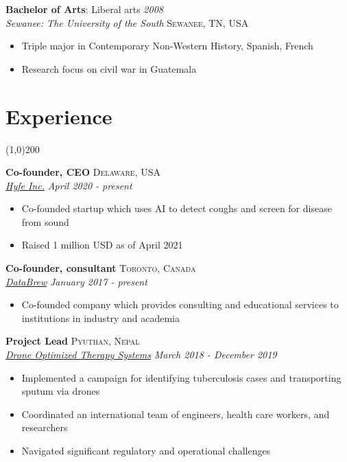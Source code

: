 \documentclass[11pt]{article}
\begin{document}
{\noindent \textbf{Bachelor of Arts}: Liberal arts \hfill \emph{2008}\\
\noindent \emph{Sewanee: The University of the South} \hfill \textsc{Sewanee, TN, USA}
\vspace{-2mm}
\begin{itemize}\itemsep0pt \parskip0pt 
\item Triple major in Contemporary Non-Western History, Spanish, French
\item Research focus on civil war in Guatemala
\end{itemize}




\newpage



\section*{Experience} %
\vspace{-7mm}
\line(1,0){200}
\vspace{2mm}

\noindent \textbf{Co-founder, CEO} \hfill \textsc{Delaware, USA}\\
\noindent \emph{\href{https://hyfeapp.com}{Hyfe Inc.}} \hfill \emph{April 2020 - present}
\vspace{-2mm}
\begin{itemize}\itemsep0pt \parskip0pt 
\item Co-founded startup which uses AI to detect coughs and screen for disease from sound
\item Raised 1 million USD as of April 2021
\end{itemize}


\noindent \textbf{Co-founder, consultant} \hfill \textsc{Toronto, Canada}\\
\noindent \emph{\href{www.databrew.cc}{DataBrew}} \hfill \emph{January 2017 - present}
\vspace{-2mm}
\begin{itemize}\itemsep0pt \parskip0pt 
\item Co-founded company which provides consulting and educational services to institutions in industry and academia
\end{itemize}

\noindent \textbf{Project Lead} \hfill \textsc{Pyuthan, Nepal}\\
\noindent \emph{\href{http://droneots.com/}{Drone Optimized Therapy Systems}} \hfill \emph{March 2018 - December 2019}
\vspace{-2mm}
\begin{itemize}\itemsep0pt \parskip0pt 
\item Implemented a campaign for identifying tuberculosis cases and transporting sputum via drones
\item Coordinated an international team of engineers, health care workers, and researchers
\item Navigated significant regulatory and operational challenges 
\end{itemize}


}
\end{document}

